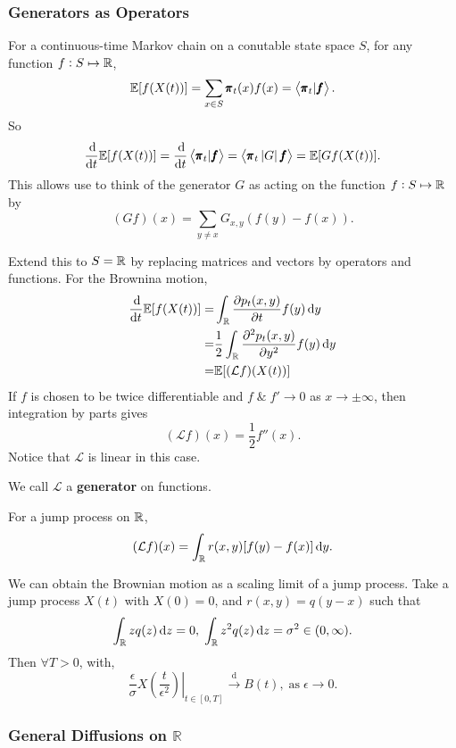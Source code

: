 \subsubsection{Generators as Operators}

For a continuous-time Markov chain on a conutable state space $S$, for any function $f: S \mapsto \mathbb{R}$, 
\begin{equation*}
    \mathbb{E} [ f(X(t)) ] = \sum_{x \in S} \pmb{\pi}_t(x) f(x) = \left< \pmb{\pi}_t | \pmb{f} \right>.
\end{equation*}
So 
\begin{equation*}
    \frac{\dif}{\dif t} \E [f(X(t))] = \frac{\dif}{\dif t} \left< \mbf{\pi}_t | \mbf{f} \right> = \left< \mbf{\pi}_t \left| G \right| \mbf{f} \right> = \E [Gf(X(t))].
\end{equation*}
This allows use to think of the generator $G$ as acting on the function $f: S \mapsto \mathbb{R}$ by
\begin{equation*}
    (Gf)(x) = \sum_{y \neq x} G_{x,y} \left( f(y) - f(x) \right). 
\end{equation*}

Extend this to $S = \mathbb{R}$ by replacing matrices and vectors by operators and functions. For the Brownina motion, 
\begin{align*}
    \frac{\dif}{\dif t} \E [f(X(t))] = & \int_\mbb{R} \frac{\partial p_t(x,y)}{\partial t} f(y) \dif y \\ 
    = & \frac{1}{2} \int_\mbb{R} \frac{\partial^2 p_t(x, y)}{\partial y^2} f(y) \dif y \\
    = & \E [ (\mathcal{L} f)(X(t)) ]
\end{align*}
If $f$ is chosen to be twice differentiable and $f \; \& \; f' \to 0$ as $x \to \pm \infty$, then integration by parts gives 
\begin{equation*}
    (\mathcal{L}f)(x) = \frac{1}{2} f''(x).
\end{equation*}
Notice that $\mathcal{L}$ is linear in this case.

\begin{definition}[Generators]
    We call $\mathcal{L}$ a \textbf{generator} on functions.
\end{definition}


For a jump process on $\mathbb{R}$, 
\begin{align*}
    (\mathcal{L}f)(x) = \int_\mbb{R} r(x,y) [f(y) - f(x)] \dif y.
\end{align*}

We can obtain the Brownian motion as a scaling limit of a jump process. Take a jump process $X(t)$ with  $X(0) = 0$, and $r(x,y) = q(y-x)$ such that 
\begin{equation*}
    \int_\mbb{R} z q(z) \dif z = 0, \; \int_\mbb{R} z^2 q(z) \dif z = \sigma^2 \in (0, \infty).
\end{equation*}
Then $\forall T > 0$, with,
\begin{equation*}
    \left. \frac{\epsilon}{\sigma} X(\frac{t}{\epsilon^2}) \right|_{t \in [0, T]} \xrightarrow{\text{d}} B(t), \; \text{as} \; \epsilon \to 0.
\end{equation*}

\subsubsection{General Diffusions \texorpdfstring{on $\mathbb{R}$}{}}